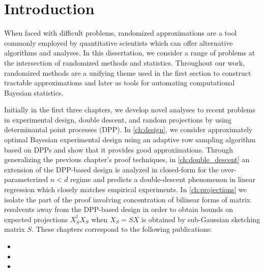 \documentclass[thesis.tex]{subfiles}
\begin{document}
\chapter{Introduction}
\label{ch:intro}

When faced with difficult problems, randomized approximations are a tool
commonly employed by quantitative scientists which can offer alternative
algorithms and analyses. In this dissertation, we consider a range of problems
at the intersection of randomized methods and statistics.
Throughout our work, randomized methods are a unifying theme used in the first section to
construct tractable approximations and later as tools for automating computational Bayesian statistics.

Initially in the first three chapters, we develop novel analyses to recent problems
in experimental design, double descent, and random projections by using determinantal
point processes (DPP).
In \cref{ch:design}, we consider approximately optimal Bayesian experimental design
using an adaptive row sampling algorithm based on DPPs and show that it provides
good approximations. Through generalizing the previous chapter's proof techniques,
in \cref{ch:double_descent} an extension of the DPP-based design is analyzed in
closed-form for the over-parameterized $n < d$ regime and predicts a double-descent phenomenon in
linear regression which closely matches empirical experiments.
In \cref{ch:projections} we isolate the part of the proof involving concentration
of bilinear forms of matrix resolvents away from the DPP-based design in order to obtain bounds on
expected projections $X_S^\dag X_S$ when $X_S = S X$ is obtained by sub-Gaussian sketching matrix $S$.
These chapters correspond to the following publications:
\begin{itemize}
    \item {}
    \item {}
    \item {}
\end{itemize}
\end{document}
